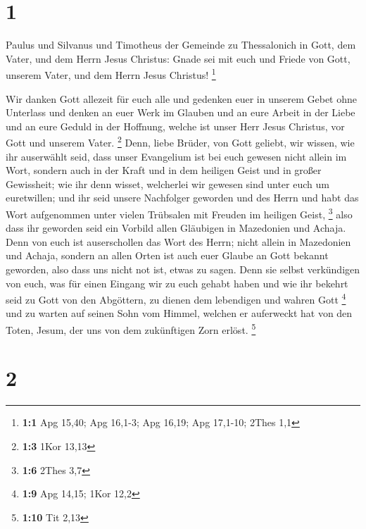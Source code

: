 \hypertarget{section}{%
\section{1}\label{section}}

 Paulus und Silvanus und Timotheus der Gemeinde zu
Thessalonich in Gott, dem Vater, und dem Herrn Jesus Christus: Gnade sei
mit euch und Friede von Gott, unserem Vater, und dem Herrn Jesus
Christus! \footnote{\textbf{1:1} Apg 15,40; Apg 16,1-3; Apg 16,19; Apg
  17,1-10; 2Thes 1,1}

 Wir danken Gott allezeit für euch alle und gedenken euer
in unserem Gebet ohne Unterlass  und denken an euer Werk
im Glauben und an eure Arbeit in der Liebe und an eure Geduld in der
Hoffnung, welche ist unser Herr Jesus Christus, vor Gott und unserem
Vater. \footnote{\textbf{1:3} 1Kor 13,13}  Denn, liebe
Brüder, von Gott geliebt, wir wissen, wie ihr auserwählt seid,
 dass unser Evangelium ist bei euch gewesen nicht allein
im Wort, sondern auch in der Kraft und in dem heiligen Geist und in
großer Gewissheit; wie ihr denn wisset, welcherlei wir gewesen sind
unter euch um euretwillen;  und ihr seid unsere Nachfolger
geworden und des Herrn und habt das Wort aufgenommen unter vielen
Trübsalen mit Freuden im heiligen Geist, \footnote{\textbf{1:6} 2Thes
  3,7}  also dass ihr geworden seid ein Vorbild allen
Gläubigen in Mazedonien und Achaja.  Denn von euch ist
auserschollen das Wort des Herrn; nicht allein in Mazedonien und Achaja,
sondern an allen Orten ist auch euer Glaube an Gott bekannt geworden,
also dass uns nicht not ist, etwas zu sagen.  Denn sie
selbst verkündigen von euch, was für einen Eingang wir zu euch gehabt
haben und wie ihr bekehrt seid zu Gott von den Abgöttern, zu dienen dem
lebendigen und wahren Gott \footnote{\textbf{1:9} Apg 14,15; 1Kor 12,2}
 und zu warten auf seinen Sohn vom Himmel, welchen er
auferweckt hat von den Toten, Jesum, der uns von dem zukünftigen Zorn
erlöst. \footnote{\textbf{1:10} Tit 2,13}

\hypertarget{section-1}{%
\section{2}\label{section-1}}

